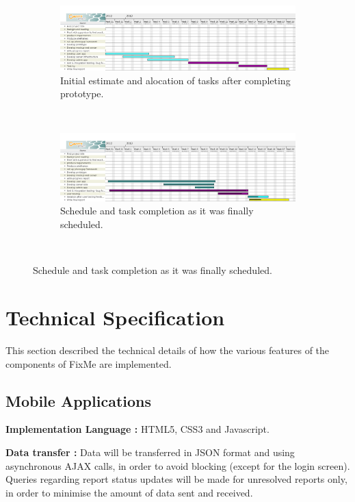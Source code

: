 \documentclass[12pt]{ecsproject}     %
\begin{document}
\begin{landscape}
\begin{figure}
\centering
	\begin{subfigure}
	\centering	
	\includegraphics[scale=0.5]{rem.png}
	\caption{Initial estimate and alocation of tasks after completing prototype.}
	\label{fig:ganorig}
	\end{subfigure}
	~
	\begin{subfigure}
	\centering	
	\includegraphics[scale=0.5]{final.png}
	\caption{Schedule and task completion as it was finally scheduled.}
	\label{fig:ganfin}
	\end{subfigure}
	~%
\label{fig:charts}
\end{figure}
\end{landscape}

\chapter{Technical Specification}
\label{app:techs}
This section described the technical details of how the various features of the components of FixMe are implemented.
\section{Mobile Applications}
\textbf{Implementation Language : } HTML5, CSS3 and Javascript.

\textbf{Data transfer : } Data will be transferred in JSON format and using asynchronous AJAX calls, in order to avoid blocking (except for the login screen). Queries regarding report status updates will be made for unresolved reports only, in order to minimise the amount of data sent and received.
\end{document}

